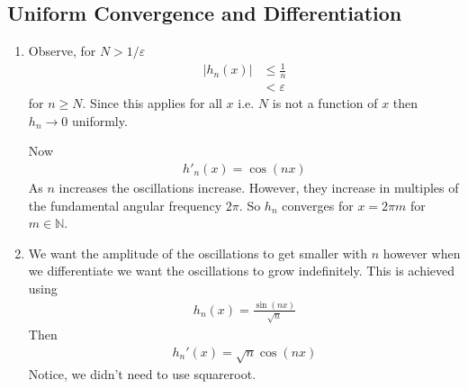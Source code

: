\subsection{Uniform Convergence and Differentiation}

\begin{enumerate}[label=(\alph*)]
    \item 
    Observe, for $N>1/\varepsilon$
    \begin{align*}
        |h_n(x)| &\leq \frac{1}{n} \\
                &< \varepsilon
    \end{align*}
    for $n\geq N$. Since this applies for all $x$ i.e. 
    $N$ is not a function of $x$ then 
    $h_n \rightarrow 0$ uniformly.

    Now
    \begin{align*}
        h'_n(x) = \cos(n x)
    \end{align*}
    As $n$ increases the oscillations increase. However, 
    they increase in multiples of the fundamental angular frequency
    $2\pi$. So $h_n$ converges for $x=2\pi m$ for $m\in \mathbb{N}$.
    
    \item
    We want the amplitude of the oscillations to get smaller with $n$
    however when we differentiate we want the oscillations to grow
    indefinitely.
    This is achieved using 
    \begin{align*}
        h_n(x) = \frac{\sin(nx)}{\sqrt{n}}
    \end{align*}
    Then
    \begin{align*}
        h_n'(x) = \sqrt{n}\cos(nx)
    \end{align*}
    Notice, we didn't need to use squareroot.
\end{enumerate}

